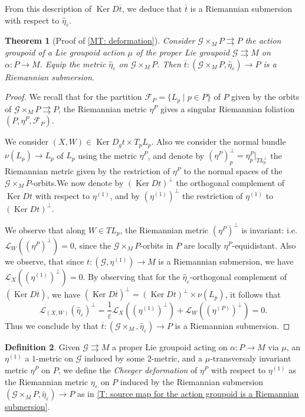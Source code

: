 \documentclass[12pt,a4paper,reqno]{amsart}
\DeclareMathOperator{\kernel}{Ker}
\newcommand{\1}{\mathbbm{1}} %
\newcommand{\fol}{\mathcal{F}} %
\newcommand{\G}{\mathcal{G}} %
\newcommand{\Lie}{\mathcal{L}} %
\newtheorem{thm}{Theorem}[section]
\theoremstyle{definition}
\newtheorem{definition}[thm]{Definition}
\theoremstyle{TheoremNum}
\begin{document}
From this description of $\kernel D \overline{t}$, we deduce that $\bar{t}$ is a Riemannian submersion with respect to $\widehat{\eta}_\varepsilon$.

\begin{thm}[Proof of \th\ref{MT: deformation}]\th\label{T: contraction of groupoid induces cheeger deformation}
Consider $\G\times_M P\rightrightarrows P$ the action groupoid of a Lie groupoid  action $\mu$ of the proper Lie groupoid $\G\rightrightarrows M$ on $\alpha\colon P\to M$. Equip the metric $\widehat{\eta}_\varepsilon$ on $\G\times_M P$. Then $\overline{t}\colon (\G\times_M P,\widehat{\eta}_\varepsilon)\to P$ is a Riemannian submersion.
\end{thm}

\begin{proof}
We recall that for the partition $\fol_P = \{L_p\mid p\in P\}$ of $P$ given by the orbits of $\G\times_M P\rightrightarrows P$, the Riemannian metric $\eta^P$ gives a singular Riemannian foliation $(P,\eta^P,\fol_P)$.

We consider $(X,W)\in \kernel D_gt\times T_pL_p$. Also we consider the normal bundle $\nu(L_p)\to L_p$ of $L_p$ using the metric $\eta^{P}$, and denote by $(\eta^P)_p^\perp = \eta^P_p|_{T L_p^\perp}$ the Riemannian metric given by the restriction of $\eta^P$ to the normal spaces of the $\G \times_M P$-orbits.We now denote by $(\kernel Dt)^\perp$ the orthogonal complement of $\kernel Dt$ with respect to $\eta^{(1)}$, and by  $(\eta^{(1)})^\perp$ the restriction of $\eta^{(1)}$ to $(\kernel Dt)^\perp$. 

We observe that along $W\in TL_p$, the Riemannian metric $(\eta^P)^\perp$ is invariant: i.e. \linebreak$\Lie_W((\eta^P)^\perp) = 0$, since the $\G\times_M P$-orbits in $P$ are locally $\eta^P$-equidistant. Also we observe, that since $t\colon (\G,\eta^{(1)})\to M$ is a Riemannian submersion, we have $\Lie_X((\eta^{(1)})^\perp) =0$. By observing that for the $\widehat{\eta}_\varepsilon$-orthogonal complement of $(\kernel D\overline{t})$, we have $(\kernel D\overline{t})^\perp = (\kernel Dt)^\perp \times \nu(L_p)$, it follows that 
\[
\Lie_{(X,W)}(\widehat{\eta}_\varepsilon)^\perp = \frac{1}{\varepsilon}\Lie_X((\eta^{(1)})^\perp)+\Lie_W ((\eta^{(P)})^\perp) = 0.
\]
Thus we conclude by \cite[Theorem~1.2.1]{GromollWalschap} that $\overline{t}\colon (\G\times_M, \widehat{\eta}_\varepsilon)\to P$ is a Riemannian submersion.
\end{proof}

\begin{definition}\label{D: Cheeger deformation}
Given $\G\rightrightarrows M$ a proper Lie groupoid acting on \linebreak$\alpha\colon  P\to M$ via $\mu$, an $\eta^{(1)}$ a $1$-metric on $\G$ induced by some $2$-metric, and a $\mu$-transversaly invariant metric $\eta^P$ on $P$, we define the \emph{Cheeger deformation} of $\eta^P$ with respect to $\eta^{(1)}$ as the Riemannian metric $\eta_\varepsilon$ on $P$ induced by the Riemannian submersion $(\G\times_{M} P,\widehat{\eta}_\varepsilon)\to P$ as in \th\ref{T: source map for the action groupoid is a Riemannian submersion}.
\end{definition}
\end{document}
